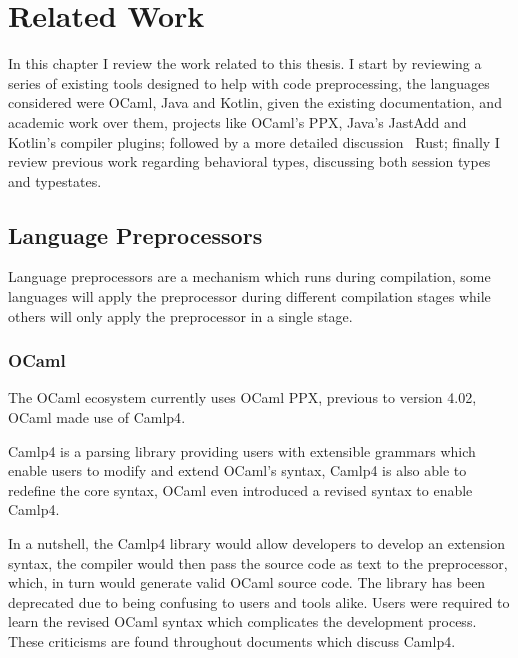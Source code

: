 
\chapter{Related Work}\label{cha:related-work}

In this chapter I review the work related to this thesis.
I start by reviewing a series of existing tools designed to help with code preprocessing,
the languages considered were OCaml, Java and Kotlin, given the existing documentation, and academic work over them,
projects like OCaml's \gls{PPX}, Java's JastAdd \autocite{Ekman2007} and Kotlin's compiler plugins;
followed by a more detailed discussion \wrt~Rust;
finally I review previous work regarding behavioral types, discussing both session types and typestates.


\section{Language Preprocessors}\label{sec:lang-preprocessors}
Language preprocessors are a mechanism which runs during compilation,
some languages will apply the preprocessor during different compilation stages while others will only apply the preprocessor in a single stage.

\subsection{OCaml}\label{sec:lang-preprocessors:ocaml}

The OCaml ecosystem currently uses OCaml \gls{PPX},
previous to version 4.02, OCaml made use of \gls{Camlp4}.

\gls{Camlp4} is a parsing library providing users with extensible grammars which enable users to modify and extend OCaml's syntax,
\gls{Camlp4} is also able to redefine the core syntax,
OCaml even introduced a revised syntax to enable \gls{Camlp4}.

In a nutshell, the \gls{Camlp4} library would allow developers to develop an extension syntax,
the compiler would then pass the source code as text to the preprocessor,
which, in turn would generate valid OCaml source code.
The library has been deprecated due to being confusing to users and tools alike.
Users were required to learn the revised OCaml syntax which complicates the development process.
These criticisms are found throughout documents which discuss \gls{Camlp4}.

